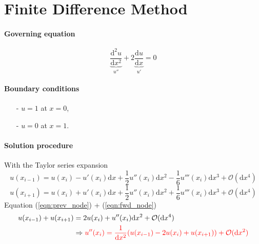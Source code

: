 \documentclass[a4paper]{article}
\begin{document}

\section{Finite Difference Method}
\paragraph{Governing equation}
\[
    \underbrace{\frac{\mathrm{d}^2 u}{\mathrm{d}x^2}}_{u''} + 2 \underbrace{\frac{\mathrm{d}u}{\mathrm{d}x}}_{u'} = 0
\]
\paragraph{Boundary conditions}
\begin{itemize}
    \item[-] $u=1$ at $x=0$,
    \item[-] $u=0$ at $x=1$.
\end{itemize}
\paragraph{Solution procedure}
With the Taylor series expansion
\begin{equation}
\label{eqn:prev_node}
    u(x_{i-1}) = u(x_i) - u'(x_i)\mathrm{d}x + \frac{1}{2}u''(x_i)\mathrm{d}x^2 - \frac{1}{6}u'''(x_i)\mathrm{d}x^3 + \mathcal{O}(\mathrm{d}x^4)
\end{equation}
\begin{equation}
\label{eqn:fwd_node}
    u(x_{i+1}) = u(x_i) + u'(x_i)\mathrm{d}x + \frac{1}{2}u''(x_i)\mathrm{d}x^2 + \frac{1}{6}u'''(x_i)\mathrm{d}x^3 + \mathcal{O}(\mathrm{d}x^4)
\end{equation}
Equation (\ref{eqn:prev_node}) + (\ref{eqn:fwd_node})
\begin{align*}
    u(x_{i-1}) + u(x_{i+1}) & = 2 u(x_i) + u''(x_i) \mathrm{d}x^2 + \mathcal{O}(\mathrm{d}x^4) \\
    & \Rightarrow {\color{red} u''(x_i) = \frac{1}{\mathrm{d}x^2} (u(x_{i-1}) - 2u(x_i) + u(x_{i+1})) + \mathcal{O}(\mathrm{d}x^2)}
\end{align*}
\end{document}
